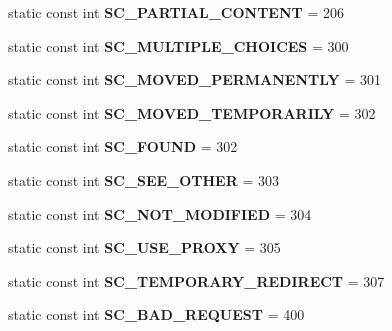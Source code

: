 \begin{DoxyCompactItemize}
static const int {\bfseries S\+C\+\_\+\+P\+A\+R\+T\+I\+A\+L\+\_\+\+C\+O\+N\+T\+E\+NT} = 206
\item 
\mbox{\label{class_http_servlet_response_a515985513048e4c49fc86b93b91cf40b}} 
static const int {\bfseries S\+C\+\_\+\+M\+U\+L\+T\+I\+P\+L\+E\+\_\+\+C\+H\+O\+I\+C\+ES} = 300
\item 
\mbox{\label{class_http_servlet_response_a0e98cfeead6374c8790edb762ad59b44}} 
static const int {\bfseries S\+C\+\_\+\+M\+O\+V\+E\+D\+\_\+\+P\+E\+R\+M\+A\+N\+E\+N\+T\+LY} = 301
\item 
\mbox{\label{class_http_servlet_response_a0309e64aabf461686b3db650cfa10c02}} 
static const int {\bfseries S\+C\+\_\+\+M\+O\+V\+E\+D\+\_\+\+T\+E\+M\+P\+O\+R\+A\+R\+I\+LY} = 302
\item 
\mbox{\label{class_http_servlet_response_ae54f6fa42eaa909df22ecf6c199be6b3}} 
static const int {\bfseries S\+C\+\_\+\+F\+O\+U\+ND} = 302
\item 
\mbox{\label{class_http_servlet_response_af538867138f24543a02ac5c5410e243b}} 
static const int {\bfseries S\+C\+\_\+\+S\+E\+E\+\_\+\+O\+T\+H\+ER} = 303
\item 
\mbox{\label{class_http_servlet_response_a6bc033cc9c8ace2147c062614f96ea13}} 
static const int {\bfseries S\+C\+\_\+\+N\+O\+T\+\_\+\+M\+O\+D\+I\+F\+I\+ED} = 304
\item 
\mbox{\label{class_http_servlet_response_ae1007c3d5ef35b7b0ac0efc384646a57}} 
static const int {\bfseries S\+C\+\_\+\+U\+S\+E\+\_\+\+P\+R\+O\+XY} = 305
\item 
\mbox{\label{class_http_servlet_response_a11d52c2ec969ec55109146b5950bc092}} 
static const int {\bfseries S\+C\+\_\+\+T\+E\+M\+P\+O\+R\+A\+R\+Y\+\_\+\+R\+E\+D\+I\+R\+E\+CT} = 307
\item 
\mbox{\label{class_http_servlet_response_a2a226ac2c949f84ccaf7a9391d5e3bfb}} 
static const int {\bfseries S\+C\+\_\+\+B\+A\+D\+\_\+\+R\+E\+Q\+U\+E\+ST} = 400

\end{DoxyCompactItemize}
